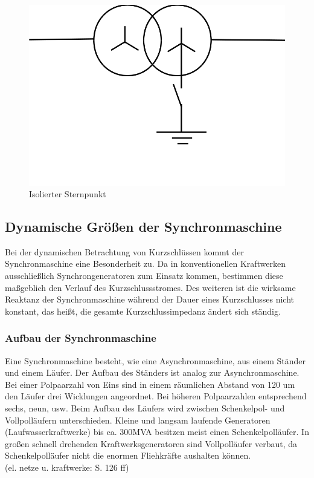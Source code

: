 \documentclass{scrartcl}
\begin{document}
\begin{onehalfspace}
	\begin{figure}[H]
	\centering
	\includegraphics[scale=0.3]{img/isolierter-sp.png}
	\caption{Isolierter Sternpunkt}
	\label{isolierter-sp}
	\end{figure}

\newpage
\subsection{Dynamische Größen der Synchronmaschine}
Bei der dynamischen Betrachtung von Kurzschlüssen kommt der Synchronmaschine eine Besonderheit zu. Da in konventionellen Kraftwerken ausschließlich Synchrongeneratoren zum Einsatz kommen, bestimmen diese maßgeblich den Verlauf des Kurzschlussstromes. Des weiteren ist die wirksame Reaktanz der Synchronmaschine während der Dauer eines Kurzschlusses nicht konstant, das heißt, die gesamte Kurzschlussimpedanz ändert sich ständig.

\subsubsection{Aufbau der Synchronmaschine}
Eine Synchronmaschine besteht, wie eine Asynchronmaschine, aus einem Ständer und einem Läufer. Der Aufbau des Ständers ist analog zur Asynchronmaschine. Bei einer Polpaarzahl von Eins sind in einem räumlichen Abstand von 120\degree{} um den Läufer drei Wicklungen angeordnet. Bei höheren Polpaarzahlen entsprechend sechs, neun, usw. Beim Aufbau des Läufers wird zwischen Schenkelpol- und Vollpolläufern unterschieden. Kleine und langsam laufende Generatoren (Laufwasserkraftwerke) bis ca. 300MVA besitzen meist einen Schenkelpolläufer. In großen schnell drehenden Kraftwerksgeneratoren sind Vollpolläufer verbaut, da Schenkelpolläufer nicht die enormen Fliehkräfte aushalten können. 
\\ (el. netze u. kraftwerke: S. 126 ff)


\end{onehalfspace}
\end{document}
